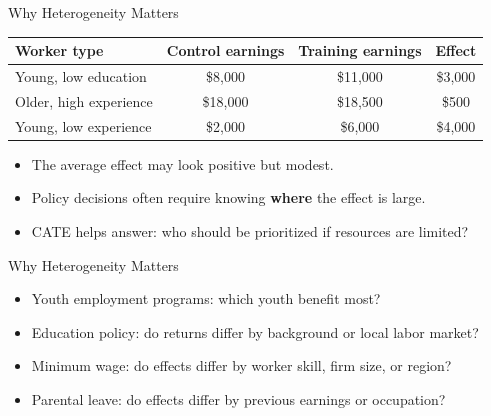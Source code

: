 \documentclass[hyperref={pdfpagelabels=false}]{beamer}
\begin{document}
\begin{frame}{Why Heterogeneity Matters}
\begin{center}
\small
\begin{tabular}{lccc}
\toprule
Worker type & Control earnings & Training earnings & Effect \\
\midrule
Young, low education & \$8,000 & \$11,000 & \$3,000 \\
Older, high experience & \$18,000 & \$18,500 & \$500 \\
Young, low experience & \$2,000 & \$6,000 & \$4,000 \\
\bottomrule
\end{tabular}
\end{center}

\vspace{0.3cm}
\begin{itemize}
  \item The average effect may look positive but modest.
  \item Policy decisions often require knowing \textbf{where} the effect is large.
  \item CATE helps answer: who should be prioritized if resources are limited?
\end{itemize}
\end{frame}


\begin{frame}{Why Heterogeneity Matters}
\begin{itemize}

  \item Youth employment programs: which youth benefit most?
  \vspace{0.2cm}
  \item Education policy: do returns differ by background or local labor market?
  \vspace{0.2cm}
  \item Minimum wage: do effects differ by worker skill, firm size, or region?
  \vspace{0.2cm}
  \item Parental leave: do effects differ by previous earnings or occupation?
\end{itemize}
\end{frame}




\end{document}
